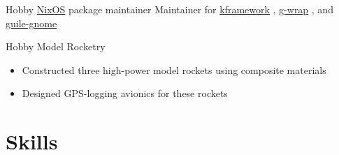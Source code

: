 \documentclass[10pt,letterpaper,sans]{moderncv}
\newcommand{\ghCommit}{{\githubfont\char"F01F}}
\newcommand{\wlink}[2]{\textcolor[HTML]{0071E6}{\href{#1}{#2}}}
\newcommand{\nixpkg}[2]{%
  \wlink{https://github.com/NixOS/nixpkgs/tree/master/pkgs/#1/#2/default.nix}%
        {#2}%
}
\newcommand{\ghlink}[2]{\wlink{https://github.com/#1}{#2}}
\newcommand{\ghlang}[1]{\texttt{#1}}
\newcommand{\ghcom}[1]{\textcolor[HTML]{666666}{\ghCommit{} #1}}
\newcommand{\ghadd}[1]{\textcolor[HTML]{6CC644}{\faicon{plus-sign} #1}}
\newcommand{\ghrem}[1]{\textcolor[HTML]{BD2C00}{\faicon{minus-sign} #1}}
\newcommand{\ghtr}[0]{}
\newcommand{\ghtf}[0]{\faCodeFork}
\newcommand{\ghtable}[6]{#1 & #2 & #3 & #4 & #5 & #6 \\}
\newcommand{\ghr}[9]{
  \ghtable{\ghtr{}}
          {\ghlink{#1/#2}{#2}}
          {\ghlang{#3}}
          {\ghcom{#4}}
          {\ghadd{#5}}
          {\ghrem{#6}}%
}
\newcommand{\ghf}[9]{
  \ghtable{\ghtf{}}
          {\ghlink{#1/#2}{#2}}
          {\ghlang{#3}}
          {\ghcom{#4}}
          {\ghadd{#5}}
          {\ghrem{#6}}%
}
\begin{document}
{\begin{tabular}{l l l l l l}
  \midrule
\end{tabular}
}

        {Hobby}
        {\wlink{http://nixos.org}{NixOS} package maintainer}
        {}{}{
Maintainer for %
\nixpkg{applications/science/programming}{kframework}, %
\nixpkg{development/tools/guile}{g-wrap}, and %
\nixpkg{development/tools/guile-modules}{guile-gnome}%
}

        {Hobby}
        {Model Rocketry}
        {}{}{
  \begin{itemize}
  \item Constructed three high-power model rockets using composite materials
  \item Designed GPS-logging avionics for these rockets
  \end{itemize}
}

\section{Skills}

\newpage
\end{document}
